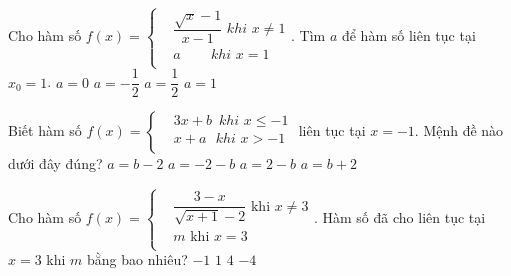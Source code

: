 \begin{ex}%
	
	Cho hàm số $f\left( x \right)=\left\{ \begin{aligned}
		& \dfrac{\sqrt{x}-1}{x-1}\,\,khi\,\,x\ne 1 \\
		& a\,\,\,\,\,\,\,\,\,\,\,\,\,khi\,\,x=1 \\
	\end{aligned} \right.$. Tìm $a$ để hàm số liên tục tại $x_0=1$.
	\choice
	{ $a=0$}
	{ $a=-\dfrac{1}{2}$}
	{\True $a=\dfrac{1}{2}$}
	{ $a=1$}
\end{ex}
\begin{ex}%
	
	Biết hàm số $f\left( x \right)=\left\{ \begin{aligned}
		& 3x+b\,\,\,khi\,\,x\le -1 \\
		& x+a\,\,\,\,khi\,\,x>-1 \\
	\end{aligned} \right.$ liên tục tại $x=-1$. Mệnh đề nào dưới đây đúng?
	\choice
	{\True $a=b-2$}
	{ $a=-2-b$}
	{ $a=2-b$}
	{ $a=b+2$}
\end{ex}
\begin{ex}%
	
	Cho hàm số $f\left( x \right)=\left\{ \begin{aligned}
		& \dfrac{3-x}{\sqrt{x+1}-2}\text{ khi }x\ne 3 \\
		& m\text{        khi $x=3$} \\
	\end{aligned} \right.$. Hàm số đã cho liên tục tại $x=3$ khi $m$ bằng bao nhiêu?
	\choice
	{ $-1$}
	{ $1$}
	{ $4$}
	{\True $-4$}
\end{ex}

